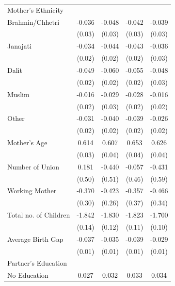 \begin{longtable}{l*{4}{c}}
\multicolumn{5}{l}{Mother's Ethnicity} \\
\hspace{1em}Brahmin/Chhetri & -0.036 & -0.048 & -0.042 & -0.039 \\
                    & (0.03) & (0.03) & (0.03) & (0.03) \\
\hspace{1em}Janajati & -0.034 & -0.044\sym{*} & -0.043\sym{*} & -0.036 \\
                    & (0.02) & (0.02) & (0.02) & (0.03) \\
\hspace{1em}Dalit & -0.049\sym{**} & -0.060\sym{**} & -0.055\sym{**} & -0.048\sym{*} \\
                    & (0.02) & (0.02) & (0.02) & (0.03) \\
\hspace{1em}Muslim & -0.016 & -0.029 & -0.028 & -0.016 \\
                    & (0.02) & (0.03) & (0.02) & (0.02) \\
\hspace{1em}Other & -0.031 & -0.040\sym{*} & -0.039\sym{*} & -0.026 \\
                    & (0.02) & (0.02) & (0.02) & (0.02) \\
Mother's Age & 0.614\sym{***} & 0.607\sym{***} & 0.653\sym{***} & 0.626\sym{***} \\
                    & (0.03) & (0.04) & (0.04) & (0.04) \\
Number of Union & 0.181 & -0.440 & -0.057 & -0.431 \\
                    & (0.50) & (0.51) & (0.46) & (0.59) \\
Working Mother & -0.370 & -0.423 & -0.357 & -0.466 \\
                    & (0.30) & (0.26) & (0.37) & (0.34) \\
Total no. of Children & -1.842\sym{***} & -1.830\sym{***} & -1.823\sym{***} & -1.700\sym{***} \\
                    & (0.14) & (0.12) & (0.11) & (0.10) \\
Average Birth Gap & -0.037\sym{***} & -0.035\sym{***} & -0.039\sym{***} & -0.029\sym{***} \\
                    & (0.01) & (0.01) & (0.01) & (0.01) \\
\multicolumn{5}{l}{Partner's Education} \\
\hspace{1em}No Education & 0.027 & 0.032 & 0.033 & 0.034 \\

\end{longtable}
